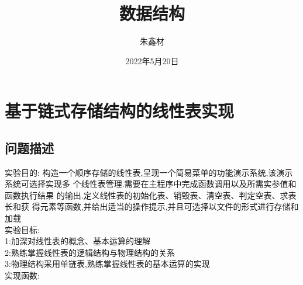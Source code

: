 \documentclass[supercite]{HustGraduPaper}
\title{~~~~~~数据结构~~~~~~}
\author{朱鑫材}
\date{2022年5月20日}
\theoremstyle{definition}
\begin{document}
\maketitle[logo color=black]
\clearpage %
\tableofcontents
\section{基于链式存储结构的线性表实现}
\subsection{问题描述}
实验目的:
构造一个顺序存储的线性表,呈现一个简易菜单的功能演示系统,该演示系统可选择实现多
个线性表管理.需要在主程序中完成函数调用以及所需实参值和函数执行结果
的输出.定义线性表的初始化表、销毁表、清空表、判定空表、求表长和获
得元素等函数,并给出适当的操作提示,并且可选择以文件的形式进行存储和
加载\\
实验目标:\\
1:\quad 加深对线性表的概念、基本运算的理解\\
2:\quad 熟练掌握线性表的逻辑结构与物理结构的关系\\
3:\quad 物理结构采用单链表,熟练掌握线性表的基本运算的实现\\
实现函数:
\end{document}
